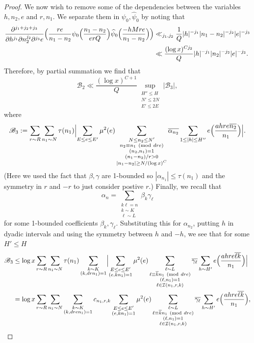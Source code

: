 \documentclass[10pt]{amsart}
\theoremstyle{plain}
\numberwithin{equation}{section}
\newcommand{\Mod}[1]{\ (\mathrm{mod}\ #1)}
\renewcommand{\hat}[1]{\widehat #1}
\begin{document}
\begin{proof}
We now wish to remove some of the dependencies between the variables $h,n_2,e$ and $r,n_1$. We separate them in $\psi_0,\hat{\psi_0}$ by noting that
\begin{align*}
\frac{\partial^{j_1+j_2+j_3}}{\partial h^{j_1}\partial n_2^{j_2} \partial^{j_3}e}\Bigl(\frac{r e}{n_1-n_2}\psi_0\Bigl(\frac{n_1-n_2}{e r Q} \Bigr)\hat{\psi_0}\Bigl(\frac{ -h M r e}{n_1-n_2}\Bigr)\Bigr)&\ll_{j_1,j_2}\frac{1}{Q} |h|^{-j_1}|n_1-n_2|^{-j_2}|e|^{-j_3}\\
&\ll \frac{(\log{x})^{C j_2}}{Q}|h|^{-j_1}|n_2|^{-j_2}|e|^{-j_3}.
\end{align*}
Therefore, by partial summation we find that
\[
\mathscr{B}_2\ll \frac{(\log{x})^{C+1}}{Q}\sup_{\substack{H''\le H\\ N'\le 2N\\ E'\le 2E}}|\mathscr{B}_3|,
\]
where
\[
\mathscr{B}_3:=\sum_{r\sim R}\sum_{n_1\sim N}\tau(n_1)\Bigl|\sum_{E\le e\le E'}\mu^2(e)\sum_{\substack{N\le n_2\le N'\\ n_2\equiv n_1\Mod{d r e}\\ (n_2,n_1)=1 \\ (n_1-n_2)/r>0\\ |n_1-n_2|\ge N/(\log{x})^C}}\overline{\alpha_{n_2}}\sum_{1\le |h|\le H''}e\Bigl(\frac{ahre\overline{n_2}}{n_1}\Bigr)\Bigr|.
\]
(Here we used the fact that $\beta,\gamma$ are 1-bounded so $|\alpha_{n_1}|\le \tau(n_1)$ and the symmetry in $r$ and $-r$ to just consider postive $r$.) Finally, we recall that
\[
\alpha_{n}=\sum_{\substack{k\ell=n\\ k\sim K\\ \ell\sim L}}\beta_k\gamma_\ell
\]
for some 1-bounded coefficients $\beta_k,\gamma_\ell$. Substituting this for $\alpha_{n_2}$, putting $h$ in dyadic intervals and using the symmetry between $h$ and $-h$, we see that for some $H'\le H$
\begin{align*}
\mathscr{B}_3&\le \log{x}\sum_{r \sim R}\sum_{n_1\sim N}\tau(n_1)\sum_{\substack{k\sim K\\ (k,d r n_1)=1}}\Bigl|\sum_{\substack{E\le e\le E'\\ (e,k n_1)=1}}\mu^2(e)\sum_{\substack{\ell\sim L\\ \ell \equiv \overline{k}n_1\Mod{d r e} \\ (\ell,n_1)=1\\ \ell\in\mathcal{I}(n_1,r,k)}}\overline{\gamma_\ell}\sum_{h\sim H'} e\Bigl(\frac{ah r e\overline{\ell k}}{n_1}\Bigr)\Bigr|\\
&=\log{x}\sum_{r \sim R}\sum_{n_1\sim N}\sum_{\substack{k\sim K\\ (k,dre n_1)=1}}c_{n_1,r,k}\sum_{\substack{E\le e\le E'\\ (e,k n_1)=1}}\mu^2(e)\sum_{\substack{\ell\sim L\\ \ell \equiv \overline{k}n_1\Mod{d r e} \\ (\ell,n_1)=1\\ \ell\in\mathcal{I}(n_1,r,k)}}\overline{\gamma_\ell}\sum_{h\sim H'} e\Bigl(\frac{ah r e\overline{\ell k}}{n_1}\Bigr),

\end{align*}
\end{proof}
\end{document}

